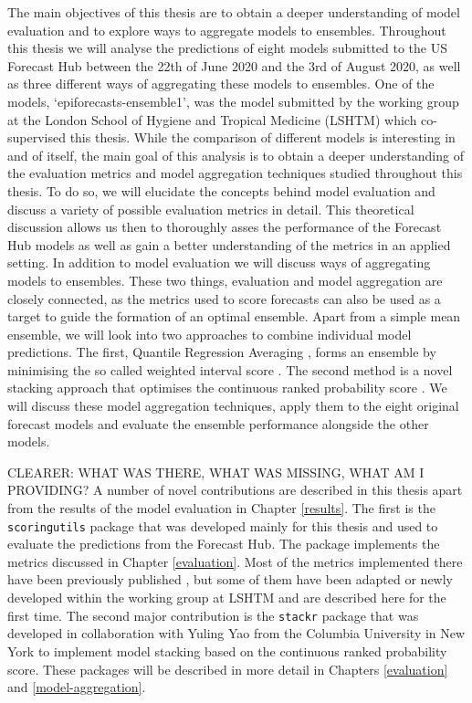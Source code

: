\documentclass[
]{book}
\begin{document}
The main objectives of this thesis are to obtain a deeper understanding of model evaluation and to explore ways to aggregate models to ensembles. Throughout this thesis we will analyse the predictions of eight models submitted to the US Forecast Hub between the 22th of June 2020 and the 3rd of August 2020, as well as three different ways of aggregating these models to ensembles. One of the models, `epiforecasts-ensemble1', was the model submitted by the working group at the London School of Hygiene and Tropical Medicine (LSHTM) which co-supervised this thesis. While the comparison of different models is interesting in and of itself, the main goal of this analysis is to obtain a deeper understanding of the evaluation metrics and model aggregation techniques studied throughout this thesis. To do so, we will elucidate the concepts behind model evaluation and discuss a variety of possible evaluation metrics in detail. This theoretical discussion allows us then to thoroughly asses the performance of the Forecast Hub models as well as gain a better understanding of the metrics in an applied setting. In addition to model evaluation we will discuss ways of aggregating models to ensembles. These two things, evaluation and model aggregation are closely connected, as the metrics used to score forecasts can also be used as a target to guide the formation of an optimal ensemble. Apart from a simple mean ensemble, we will look into two approaches to combine individual model predictions. The first, Quantile Regression Averaging \citep{nowotarskiComputingElectricitySpot2015}, forms an ensemble by minimising the so called weighted interval score \citep{gneitingStrictlyProperScoring2007}. The second method is a novel stacking approach \citep{yaoUsingStackingAverage2018} that optimises the continuous ranked probability score \citep{mathesonScoringRulesContinuous1976, gneitingStrictlyProperScoring2007}. We will discuss these model aggregation techniques, apply them to the eight original forecast models and evaluate the ensemble performance alongside the other models.

CLEARER: WHAT WAS THERE, WHAT WAS MISSING, WHAT AM I PROVIDING?
A number of novel contributions are described in this thesis apart from the results of the model evaluation in Chapter \ref{results}. The first is the \texttt{scoringutils} package \citep{R-scoringutils} that was developed mainly for this thesis and used to evaluate the predictions from the Forecast Hub. The package implements the metrics discussed in Chapter \ref{evaluation}. Most of the metrics implemented there have been previously published \citep{bracherEvaluatingEpidemicForecasts2020, funkAssessingPerformanceRealtime2019, gneitingStrictlyProperScoring2007}, but some of them have been adapted or newly developed within the working group at LSHTM and are described here for the first time. The second major contribution is the \texttt{stackr} package \citep{R-stackr} that was developed in collaboration with Yuling Yao from the Columbia University in New York to implement model stacking based on the continuous ranked probability score. These packages will be described in more detail in Chapters \ref{evaluation} and \ref{model-aggregation}.
\end{document}
